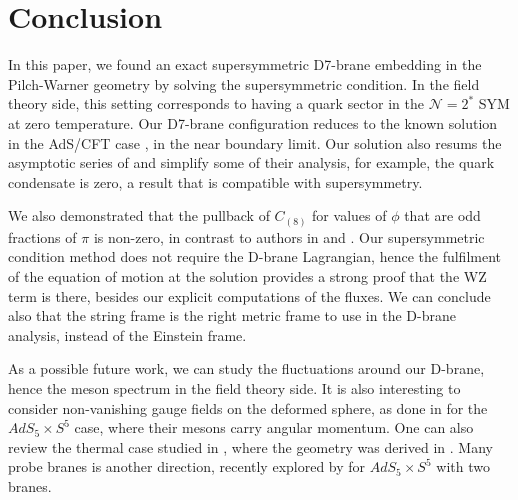 \section{Conclusion}

In this paper, we found an exact supersymmetric D7-brane embedding in the Pilch-Warner geometry by solving the supersymmetric condition. In the field theory side, this setting corresponds to having a quark sector in the $\mathcal{N}=2^*$ SYM at zero temperature. Our D7-brane configuration reduces to the known solution in the AdS/CFT case \cite{Karch:2005ms}, in the near boundary limit. Our solution also resums the asymptotic series of \cite{Albash:2011nw} and simplify some of their analysis, for example, the quark condensate is zero, a result that is compatible with supersymmetry. 

We also demonstrated that the pullback of $C_{(8)}$ for values of $\phi$ that are odd fractions of $\pi$ is non-zero, in contrast to authors in \cite{Albash:2011nw} and \cite{Evans:2005ti}. Our supersymmetric condition method does not require the D-brane Lagrangian, hence the fulfilment of the equation of motion at the solution provides a strong proof that the WZ term is there, besides our explicit computations of the fluxes. We can conclude also that the string frame is the right metric frame to use in the D-brane analysis, instead of the Einstein frame. 

As a possible future work, we can study the fluctuations around our D-brane, hence the meson spectrum in the field theory side. 
It is also interesting to consider non-vanishing gauge fields on the deformed sphere, as done in \cite{Kruczenski:2003be} for the $AdS_5 \times S^5$ case, where their mesons carry angular momentum. One can also review the thermal case studied in \cite{Albash:2011dq}, where the geometry was derived in \cite{Buchel:2003ah}. Many probe branes is another direction, recently explored by \cite{Faedo:2019jlp} for $AdS_5 \times S^5$ with two branes.


